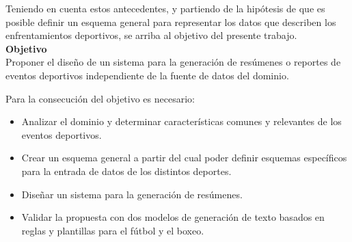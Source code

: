 

Teniendo en cuenta estos antecedentes, y partiendo de la hipótesis de que es posible definir un esquema general para representar los datos que describen los enfrentamientos deportivos,
se arriba al objetivo del presente trabajo.\\



    \textbf{Objetivo}\\

    Proponer el diseño de un sistema para la generación de res\'umenes o reportes de eventos deportivos 
independiente de la fuente de datos del dominio.


    Para la consecución del objetivo es necesario:

    \begin{itemize}
        \item Analizar el dominio y determinar características comunes y relevantes de los eventos deportivos.
        \item Crear un esquema general a partir del cual poder definir esquemas específicos para la entrada de datos de los distintos deportes.
        \item Diseñar un sistema para la generación de resúmenes.
        \item Validar la propuesta con dos modelos de generación de texto basados en reglas y plantillas para el fútbol y el boxeo.   
    \end{itemize}

